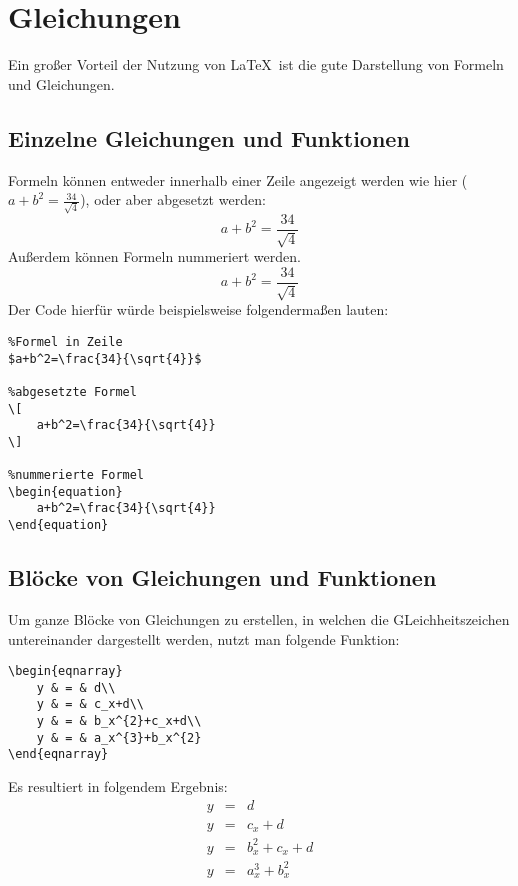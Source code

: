 \chapter{Gleichungen}
Ein großer Vorteil der Nutzung von \LaTeX\ ist die gute Darstellung von Formeln und Gleichungen. 
\section{Einzelne Gleichungen und Funktionen}
Formeln können entweder innerhalb einer Zeile angezeigt werden wie hier ($a+b^2=\frac{34}{\sqrt{4}}$), oder aber abgesetzt werden:
\[
    a+b^2=\frac{34}{\sqrt{4}}
\]
Außerdem können Formeln nummeriert werden.
\begin{equation}
    a+b^2=\frac{34}{\sqrt{4}}
\end{equation}
Der Code hierfür würde beispielsweise folgendermaßen lauten:
\begin{lstlisting}
%Formel in Zeile
$a+b^2=\frac{34}{\sqrt{4}}$

%abgesetzte Formel
\[
    a+b^2=\frac{34}{\sqrt{4}}
\]

%nummerierte Formel
\begin{equation}
    a+b^2=\frac{34}{\sqrt{4}}
\end{equation}
\end{lstlisting}

\section{Blöcke von Gleichungen und Funktionen}
Um ganze Blöcke von Gleichungen zu erstellen, in welchen die GLeichheitszeichen untereinander dargestellt werden, nutzt man folgende Funktion:

\begin{lstlisting}
\begin{eqnarray}
    y & = & d\\
    y & = & c_x+d\\
    y & = & b_x^{2}+c_x+d\\
    y & = & a_x^{3}+b_x^{2}
\end{eqnarray}
\end{lstlisting}
Es resultiert in folgendem Ergebnis:
\begin{eqnarray}
    y & = & d\\
    y & = & c_x+d\\
    y & = & b_x^{2}+c_x+d\\
    y & = & a_x^{3}+b_x^{2}
\end{eqnarray}

